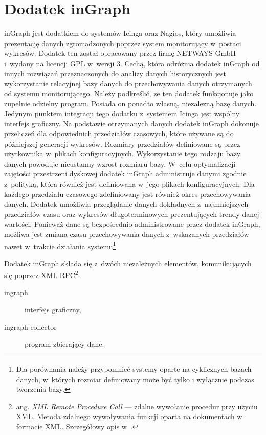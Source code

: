 \section[Dodatek inGraph][Dodatek inGraph]{Dodatek inGraph}
\label{sec:inGraph}

inGraph jest dodatkiem do systemów Icinga oraz Nagios, który umożliwia
prezentację danych zgromadzonych poprzez system monitorujący w~postaci
wykresów. Dodatek ten został opracowany przez firmę NETWAYS GmbH
i~wydany na licencji GPL w~wersji 3. Cechą, która odróżnia dodatek
inGraph od innych rozwiązań przeznaczonych do analizy danych
historycznych jest wykorzystanie relacyjnej bazy danych do
przechowywania danych otrzymanych od systemu monitorującego. Należy
podkreślić, ze ten dodatek funkcjonuje jako zupełnie odzielny
program. Posiada on ponadto własną, niezalezną bazę danych. Jedynym
punktem integracji tego dodatku z~systemem Icinga jest wspólny
interfejs graficzny.  Na podstawie otrzymanych danych dodatek inGraph
dokonuje przeliczeń dla odpowiednich przedziałów czasowych, które
używane są do późniejszej generacji wykresów. Rozmiary przedziałów
definiowane są przez użytkownika w~plikach
konfiguracyjnych. Wykorzystanie tego rodzaju bazy danych powoduje
nieustanny wzrost rozmiaru bazy. W~celu optymalizacji zajętości
przestrzeni dyskowej dodatek inGraph administruje danymi zgodnie
z~polityką, która również jest definiowana w~jego plikach
konfiguracyjnych. Dla każdego przedziału czasowego zdefiniowany jest
również okres przechowywania danych. Dodatek umożliwia przeglądanie
danych dokładnych z~najmniejszych przedziałów czasu oraz wykresów
długoterminowych prezentujących trendy danej wartości. Ponieważ dane
są bezpośrednio administrowane przez dodatek inGraph, możliwa jest
zmiana czasu przechowywania danych z~wskazanych przedziałów nawet
w~trakcie działania systemu\footnote{Dla porównania należy przypomnieć
  systemy oparte na cyklicznych bazach danych, w~których rozmiar
  definiowany może być tylko i wyłącznie podczas tworzenia bazy.}.

Dodatek inGraph składa się z~dwóch niezależnych elementów,
komunikujących się poprzez XML-RPC\footnote{ang. {\em XML Remote
    Procedure Call} --- zdalne wywołanie procedur przy użyciu
  XML. Metoda zdalnego wywoływania funkcji oparta na dokumentach w
  formacie XML. Szczegółowy opis w~\cite{www:XMLRPC}.}:

\begin{description}
\item[ingraph] interfejs graficzny,
\item[ingraph-collector] program zbierający dane.
\end{description}


